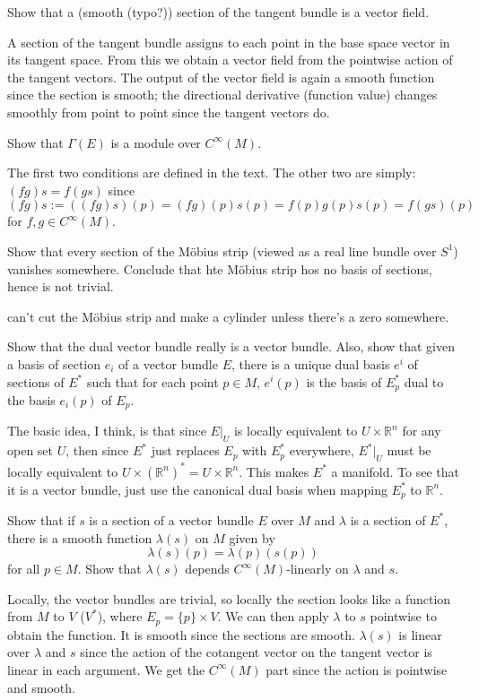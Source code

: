 \begin{p}%
{Show that a (smooth (typo?)) section of the tangent bundle is a vector field.}
\end{p}
{A section of the tangent bundle
assigns to each point in the base space vector in its tangent space. From this we obtain a 
vector field from the pointwise action of the tangent vectors. The output of the vector field is again a 
smooth function since the
section is smooth; the directional derivative (function value) changes smoothly from point to point since
the tangent vectors do.}

\begin{p}%
{Show that $\Gamma(E)$ is a module over $C^\infty(M)$.}
\end{p}
{The first two conditions are defined 
in the text. The other two are simply: $(fg)s=f(gs)$ since $(fg)s:=((fg)s)(p)=(fg)(p)s(p)=f(p)g(p)s(p)=f(gs)(p)$ for
$f,g\in C^\infty (M)$. }

\begin{p}%
{Show that every section of the M\"obius strip (viewed as a real line bundle over $S^1$) vanishes somewhere. Conclude that hte M\"obius strip hos no basis of sections, hence is not trivial.}
\end{p}
{can't cut the M\"obius strip and make a cylinder unless there's a zero somewhere.}

\begin{p}%
{Show that the dual vector bundle really is a vector bundle. Also, show that given a basis
of section $e_i$ of a vector bundle $E$, there is a unique dual basis $e^i$ of sections of $E^*$ such that for each point $p\in M$, $e^i(p)$ is the basis of $E^*_p$ dual to the basis $e_i(p)$ of $E_p$.}
\end{p}
{The basic idea, I think, is that since $E|_U$ is locally equivalent to 
$U\times \mathbb{R}^n$ for any open set $U$, then since $E^*$ just replaces 
$E_p$ with $E^*_p$ everywhere, 
$E^*|_U$ must be locally equivalent to $U\times (\mathbb{R}^n)^*=U\times \mathbb{R}^n$. 
This makes $E^*$ a manifold. To see that it is a vector bundle, just use the canonical dual basis when 
mapping $E_p^*$ to $\mathbb{R}^n$. 
}

\begin{p}%
{Show that if $s$ is a section of a vector bundle $E$ over $M$ and $\lambda$ is a 
section of $E^*$, there is a smooth function $\lambda(s)$ on $M$ given by 
\[\lambda(s)(p)=\lambda(p)(s(p))\] for all $p\in M$. Show that $\lambda(s)$ depends $C^\infty(M)$-linearly on $\lambda$ and $s$.}
\end{p}
{Locally, the vector bundles are trivial, so locally the section
looks like a function from $M$ to $V$ ($V^*$), where $E_p=\{p\}\times V$. We can then 
apply $\lambda$ to $s$ pointwise to obtain the function. It is smooth since the sections are smooth. 
$\lambda(s)$ is linear over $\lambda$ and $s$ since the action of the cotangent vector on the tangent vector is linear in each argument. We get the $C^\infty(M)$ part since the action is pointwise and smooth.}

